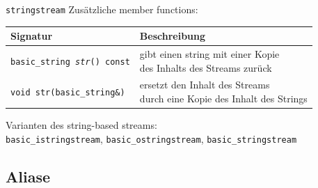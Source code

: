 \begin{frame}{\texttt{stringstream}}
	Zusätzliche member functions:
	\vspace{1em}
	
	\footnotesize
	
	\begin{tabular}{ll}
		\textbf{Signatur}	&	\textbf{Beschreibung}	\\
		\hline
		\texttt{basic\_string \emph{str}() const}	&	\parbox{25em}{gibt einen string mit einer Kopie\\ des Inhalts des Streams zurück}	\\
		\texttt{void str(basic\_string\&)}	&	\parbox{25em}{ersetzt den Inhalt des Streams\\ durch eine Kopie des Inhalt des Strings}	\\
	\end{tabular}
	
	\pause
	\vspace{2em}
	
	Varianten des string-based streams:	\\
	\texttt{basic\_istringstream}, \texttt{basic\_ostringstream}, \texttt{basic\_stringstream}
\end{frame}


\subsection{Aliase}



